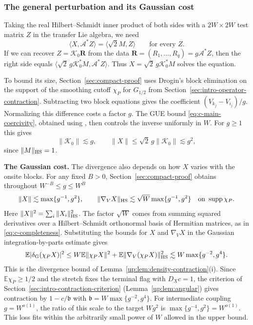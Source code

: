 \documentclass[11pt]{article}
\numberwithin{equation}{section}
\theoremstyle{remark}
\newcommand{\E}{\mathbb E}
\newcommand{\supp}{\operatorname{supp}}
\begin{document}
\subsubsection{The general perturbation and its Gaussian cost}

Taking the real Hilbert--Schmidt inner product of both sides with a
$2W\times 2W$ test matrix $Z$ in the transfer Lie algebra, we need
\[
 \langle X,\mathcal A^*Z\rangle=\langle\sqrt2 M,Z\rangle
 \qquad\text{for every }Z.
\]
If we can recover $Z=\mathcal K_0\mathbf R$ from the data
$\mathbf R=(R_1,\ldots,R_q)=g\mathcal A^*Z$, then the right side equals
$\langle\sqrt2\,g\mathcal K_0^*M,\mathcal A^*Z\rangle$.
Thus $X=\sqrt2\,g\mathcal K_0^*M$ solves the equation.

To bound its size, Section~\ref{sec:compact-proof} uses Drogin's block
elimination \cite[Proposition~4.4]{Drogin} on the support of the
smoothing cutoff $\chi_P$ for $G_{1/2}$ from Section~\ref{sec:intro-operator-contraction}.
Subtracting two block equations gives the
coefficient $(V_{k_j}-V_{i_j})/g$. Normalizing this difference costs
a factor $g$. The GUE bound \eqref{eq:c-main-coercivity}, obtained
using \cite{CGV}, then controls the inverse uniformly in $W$. For $g\ge1$
this gives
\[
 \|\mathcal K_0\|\lesssim g,\qquad
 \|X\|\le\sqrt2\,g\|\mathcal K_0\|\lesssim g^2,
\]
since $\|M\|_{\rm HS}=1$.

\medskip\noindent\textbf{The Gaussian cost.}
The divergence also depends on how $X$ varies with the onsite blocks.
For any fixed $B>0$, Section~\ref{sec:compact-proof} obtains
throughout $W^{-B}\le g\le W^B$
\[
 \|X\|\lesssim\max\{g^{-1},g^2\},\qquad
 \|\nabla_V X\|_{\rm HS}\lesssim\sqrt W\max\{g^{-1},g^2\}
 \quad\text{on }\supp\chi_P .
\]
Here $\|X\|^2=\sum_i\|X_i\|_{\rm HS}^2$. The factor $\sqrt W$ comes
from summing squared derivatives over a Hilbert--Schmidt orthonormal
basis of Hermitian matrices, as in \eqref{eq:c-completeness}.
Substituting the bounds for $X$ and $\nabla_V X$ in the Gaussian
integration-by-parts estimate gives
\[
 \E|\delta_{\rm G}(\chi_P X)|^2
 \le W\E\|\chi_P X\|^2+\E\|\nabla_V(\chi_P X)\|_{\rm HS}^2
 \lesssim W\max\{g^{-2},g^4\}.
\]
This is the divergence bound of Lemma~\ref{up:lem:density-contraction}\textup{(i)}.
Since $\E\chi_P\ge1/2$ and the stretch fixes the terminal flag with
$D_Xc=1$, the criterion of Section~\ref{sec:intro-contraction-criterion}
(Lemma~\ref{up:lem:angular}) gives contraction by $1-c/\mathfrak b$
with $\mathfrak b=W\max\{g^{-2},g^4\}$. For intermediate coupling
$g=W^{o(1)}$, the ratio of this scale to the target $Wg^2$ is
$\max\{g^{-4},g^2\}=W^{o(1)}$. This loss fits within the arbitrarily
small power of $W$ allowed in the upper bound.
\end{document}
